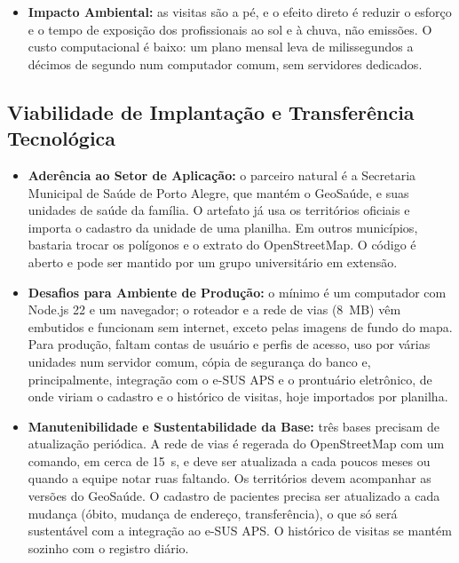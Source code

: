 \documentclass[11pt,a4paper]{article}
\begin{document}
\begin{itemize}
\begin{itemize}
        \item Rastreabilidade e explicabilidade: toda pendência sai com o motivo (paciente ausente até o prazo, nenhuma equipe com a categoria exigida, jornada cheia), todo plano passa pelo verificador formal, e o servidor guarda cada versão do cenário, cada plano e cada resultado de visita. O plano é uma sugestão: a equipe pode retirar um paciente da rota ou ajustar a duração e a folga de uma visita.
    \end{itemize}
    \item \textbf{Impacto Ambiental:} as visitas são a pé, e o efeito direto é reduzir o esforço e o tempo de exposição dos profissionais ao sol e à chuva, não emissões. O custo computacional é baixo: um plano mensal leva de milissegundos a décimos de segundo num computador comum, sem servidores dedicados.
\end{itemize}

\subsection{Viabilidade de Implantação e Transferência Tecnológica}
\begin{itemize}
    \item \textbf{Aderência ao Setor de Aplicação:} o parceiro natural é a Secretaria Municipal de Saúde de Porto Alegre, que mantém o GeoSaúde, e suas unidades de saúde da família. O artefato já usa os territórios oficiais e importa o cadastro da unidade de uma planilha. Em outros municípios, bastaria trocar os polígonos e o extrato do OpenStreetMap. O código é aberto e pode ser mantido por um grupo universitário em extensão.
    \item \textbf{Desafios para Ambiente de Produção:} o mínimo é um computador com Node.js 22 e um navegador; o roteador e a rede de vias (8~MB) vêm embutidos e funcionam sem internet, exceto pelas imagens de fundo do mapa. Para produção, faltam contas de usuário e perfis de acesso, uso por várias unidades num servidor comum, cópia de segurança do banco e, principalmente, integração com o e-SUS APS e o prontuário eletrônico, de onde viriam o cadastro e o histórico de visitas, hoje importados por planilha.
    \item \textbf{Manutenibilidade e Sustentabilidade da Base:} três bases precisam de atualização periódica. A rede de vias é regerada do OpenStreetMap com um comando, em cerca de 15~s, e deve ser atualizada a cada poucos meses ou quando a equipe notar ruas faltando. Os territórios devem acompanhar as versões do GeoSaúde. O cadastro de pacientes precisa ser atualizado a cada mudança (óbito, mudança de endereço, transferência), o que só será sustentável com a integração ao e-SUS APS. O histórico de visitas se mantém sozinho com o registro diário.
\end{itemize}
\end{document}
